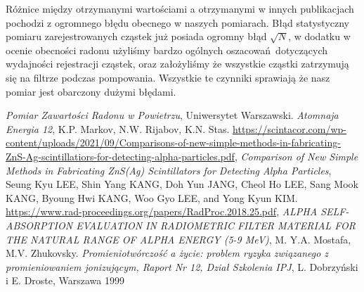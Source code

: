 \documentclass[12pt]{article}
\begin{document}
Różnice między otrzymanymi wartościami a otrzymanymi w innych publikacjach pochodzi z ogromnego błędu obecnego w naszych pomiarach. Błąd statystyczny pomiaru zarejestrowanych cząstek już posiada ogromny błąd $\sqrt{N}$, w dodatku w ocenie obecności radonu użyliśmy bardzo ogólnych oszacowań dotyczących wydajności rejestracji cząstek, oraz założyliśmy że wszystkie cząstki zatrzymują się na filtrze podczas pompowania. Wszystkie te czynniki sprawiają że nasz pomiar jest obarczony dużymi błędami.

\newpage

\begin{thebibliography}{5}

	\emph{Pomiar Zawartości Radonu w Powietrzu}, Uniwersytet Warszawski.
	\emph{Atomnaja Energia 12}, K.P. Markov, N.W. Rijabov, K.N. Stas.
    \url{https://scintacor.com/wp-content/uploads/2021/09/Comparisons-of-new-simple-methods-in-fabricating-ZnS-Ag-scintillatiors-for-detecting-alpha-particles.pdf}, \emph{Comparison of New Simple Methods in Fabricating ZnS(Ag) Scintillators for Detecting Alpha Particles}, Seung Kyu LEE, Shin Yang KANG, Doh Yun JANG, Cheol Ho LEE, Sang Mook KANG, Byoung Hwi KANG, Woo Gyo LEE, and Yong Kyun KIM. 
    \url{https://www.rad-proceedings.org/papers/RadProc.2018.25.pdf}, \emph{ALPHA SELF-ABSORPTION EVALUATION IN RADIOMETRIC FILTER MATERIAL FOR THE NATURAL RANGE OF ALPHA ENERGY (5-9 MeV)}, M. Y.A. Mostafa, M.V. Zhukovsky.
    \emph{Promieniotwórczość a życie: problem ryzyka związanego z promieniowaniem jonizującym, Raport Nr 12, Dział Szkolenia IPJ}, L. Dobrzyński i E. Droste, Warszawa 1999


\end{thebibliography}
\end{document}
